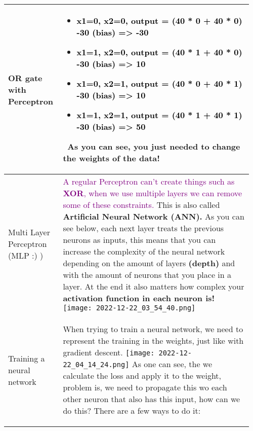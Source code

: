 \documentclass[main.tex,fontsize=8pt,paper=a4,paper=portrait,DIV=calc,]{scrartcl}
\begin{document}
\begin{table}[ht!]
\begin{tabular}{|m{0.2\linewidth}|m{0.755\linewidth}|}
\hline
OR gate with Perceptron & 
\vspace{2mm}
\begin{itemize}
\item \textcolor{black}{x1=0, x2=0, output = (40 * 0 + 40 * 0) -30 (bias) => -30}
\item \textcolor{black}{x1=1, x2=0, output = (40 * 1 + 40 * 0) -30 (bias) => 10}
\item \textcolor{black}{x1=0, x2=1, output = (40 * 0 + 40 * 1) -30 (bias) => 10}
\item \textcolor{black}{x1=1, x2=1, output = (40 * 1 + 40 * 1) -30 (bias) => 50}
  \vspace{-3mm}
\end{itemize} 
\, \newline
As you can see, you just needed to change the weights of the data!
\\
\hline
Multi Layer Perceptron (MLP :) ) & 
\textcolor{purple}{A regular Perceptron can't create things such as \textbf{XOR}, when we use multiple layers we can remove some of these constraints.}\newline
This is also called \textbf{Artificial Neural Network (ANN).}\newline
As you can see below, each next layer treats the previous neurons as inputs, this means that you can increase the complexity of the neural network depending on the amount of layers \textbf{(depth)} and with the amount of neurons that you place in a layer.\newline
At the end it also matters how complex your \textbf{activation function in each neuron is!}\newline
\texttt{[image: 2022-12-22\_03\_54\_40.png]}\\
\hline
Training a neural network & 
When trying to train a neural network, we need to represent the training in the weights, just like with gradient descent.\newline
\texttt{[image: 2022-12-22\_04\_14\_24.png]}\newline
As one can see, the we calculate the loss and apply it to the weight, problem is, we need to propagate this wo each other neuron that also has this input, how can we do this?\newline
There are a few ways to do it:\newline
\begin{itemize}

\end{itemize}
\end{tabular}
\end{table}
\end{document}

